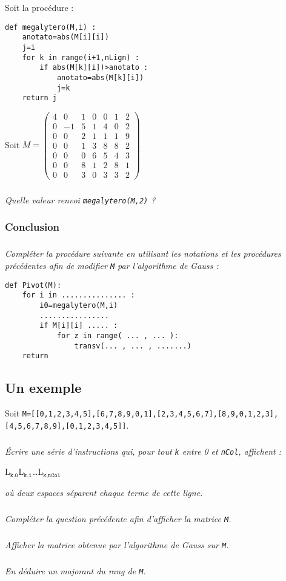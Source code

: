 \documentclass[10pt,oneside]{article}
\begin{document}
\setlength{\columnseprule}{.2pt}

Soit la procédure :

\begin{minipage}[c]{.47\linewidth}
\begin{verbatim}
def megalytero(M,i) :
    anotato=abs(M[i][i])
    j=i
    for k in range(i+1,nLign) :
        if abs(M[k][i])>anotato :
            anotato=abs(M[k][i])
            j=k
    return j
\end{verbatim}
\end{minipage}\hfill
\begin{minipage}[c]{.47\linewidth}
 Soit $M = \begin{pmatrix}
4&0&1&0&0&1&2\\0&-1&5&1&4&0&2\\0&0&2&1&1&1&9\\0&0&1&3&8&8&2\\0&0&0&6&5&4&3\\0&0&8&1&2&8&1\\0&0&3&0&3&3&2 \end{pmatrix}$
\end{minipage}

\subparagraph{}
\textit{Quelle valeur renvoi  \texttt{megalytero(M,2)} ?}



\subsubsection*{Conclusion}


\subparagraph{}
\textit{Compléter la procédure suivante en utilisant les notations et les procédures précédentes afin de modifier \texttt{M} par l'algorithme de Gauss :}
%
\begin{verbatim}
def Pivot(M):
    for i in ............... :
        i0=megalytero(M,i)
        ................
        if M[i][i] ..... : 
            for z in range( ... , ... ):
                transv(... , ... , .......)
    return
\end{verbatim}

\subsection*{Un exemple}




Soit \texttt{M=[[0,1,2,3,4,5],[6,7,8,9,0,1],[2,3,4,5,6,7],[8,9,0,1,2,3],[4,5,6,7,8,9],[0,1,2,3,4,5]]}.

\subparagraph{}
\textit{Écrire une série d'instructions qui, pour tout \texttt{k} entre 0 et \texttt{nCol}, affichent :}

\hfil L$_\texttt{k,0}$\qquad L$_\texttt{k,1}$\qquad\ldots\qquad L$_\texttt{k,nCol}$

\textit{où deux espaces séparent chaque terme de cette ligne.}

\subparagraph{}
\textit{Compléter la question précédente afin d'afficher la matrice \texttt{M}.}

\subparagraph{}
\textit{Afficher la matrice obtenue par l'algorithme de Gauss sur \texttt{M}.}

\subparagraph{}
\textit{En déduire un majorant du rang de \texttt{M}.}
\end{document}
